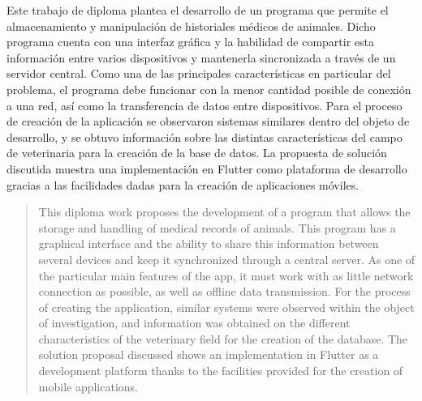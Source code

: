 \begin{resumen}
	Este trabajo de diploma plantea el desarrollo de un programa que permite el almacenamiento y manipulaci\'on de historiales m\'edicos de animales. Dicho programa cuenta con una interfaz gr\'afica y la habilidad de compartir esta informaci\'on entre varios dispositivos y mantenerla sincronizada a trav\'es de un servidor central.
	Como una de las principales caracter\'isticas en particular del problema, el programa debe funcionar con la menor cantidad posible de conexi\'on a una red, as\'i como la transferencia de datos entre dispositivos.
	 Para el proceso de creaci\'on de la aplicaci\'on se observaron sistemas similares dentro del objeto de desarrollo, y se obtuvo informaci\'on sobre las distintas caracter\'isticas del campo de veterinaria para la creaci\'on de la base de datos.
	La propuesta de soluci\'on discutida muestra una implementaci\'on en Flutter como plataforma de desarrollo gracias a las facilidades dadas para la creaci\'on de aplicaciones m\'oviles.   
	
\end{resumen}




\begin{abstract}
	This diploma work proposes the development of a program that allows the storage and handling of medical records of animals. This program has a graphical interface and the ability to share this information between several devices and keep it synchronized through a central server.
As one of the particular main features of the app, it must work with as little network connection as possible, as well as offline data transmission.
For the process of creating the application, similar systems were observed within the object of investigation, and information was obtained on the different characteristics of the veterinary field for the creation of the database.
The solution proposal discussed shows an implementation in Flutter as a development platform thanks to the facilities provided for the creation of mobile applications.
\end{abstract}